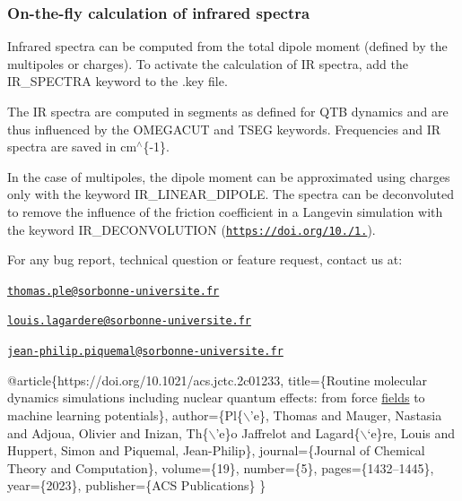 \subsubsection*{On-\/the-\/fly calculation of infrared spectra}

Infrared spectra can be computed from the total dipole moment (defined by the multipoles or charges). To activate the calculation of I\-R spectra, add the {\ttfamily I\-R\-\_\-\-S\-P\-E\-C\-T\-R\-A} keyword to the {\ttfamily .key} file.

The I\-R spectra are computed in segments as defined for Q\-T\-B dynamics and are thus influenced by the {\ttfamily O\-M\-E\-G\-A\-C\-U\-T} and {\ttfamily T\-S\-E\-G} keywords. Frequencies and I\-R spectra are saved in cm$^\wedge$\{-\/1\}.

In the case of multipoles, the dipole moment can be approximated using charges only with the keyword {\ttfamily I\-R\-\_\-\-L\-I\-N\-E\-A\-R\-\_\-\-D\-I\-P\-O\-L\-E}. The spectra can be deconvoluted to remove the influence of the friction coefficient in a Langevin simulation with the keyword {\ttfamily I\-R\-\_\-\-D\-E\-C\-O\-N\-V\-O\-L\-U\-T\-I\-O\-N} (\href{https://doi.org/10.1063/1.4990536}{\tt https\-://doi.\-org/10./1.}). 



For any bug report, technical question or feature request, contact us at\-:
\begin{DoxyItemize}
\item \href{mailto:thomas.ple@sorbonne-universite.fr}{\tt thomas.\-ple@sorbonne-\/universite.\-fr}
\item \href{mailto:louis.lagardere@sorbonne-universite.fr}{\tt louis.\-lagardere@sorbonne-\/universite.\-fr}
\item \href{mailto:jean-philip.piquemal@sorbonne-universite.fr}{\tt jean-\/philip.\-piquemal@sorbonne-\/universite.\-fr} 


\end{DoxyItemize}


\begin{DoxyCode}
@article\{https:\textcolor{comment}{//doi.org/10.1021/acs.jctc.2c01233,}
  title=\{Routine molecular dynamics simulations including nuclear quantum effects: from force 
      \hyperlink{classfields}{fields} to machine learning potentials\},
  author=\{Pl\{\(\backslash\)\textcolor{stringliteral}{'e\}, Thomas and Mauger, Nastasia and Adjoua, Olivier and Inizan, Th\{\(\backslash\)'e\}o Jaffrelot and
       Lagard\{\(\backslash\)`e\}re, Louis and Huppert, Simon and Piquemal, Jean-Philip\},}
\textcolor{stringliteral}{  journal=\{Journal of Chemical Theory and Computation\},}
\textcolor{stringliteral}{  volume=\{19\},}
\textcolor{stringliteral}{  number=\{5\},}
\textcolor{stringliteral}{  pages=\{1432--1445\},}
\textcolor{stringliteral}{  year=\{2023\},}
\textcolor{stringliteral}{  publisher=\{ACS Publications\}}
\textcolor{stringliteral}{\}}
\end{DoxyCode}
 